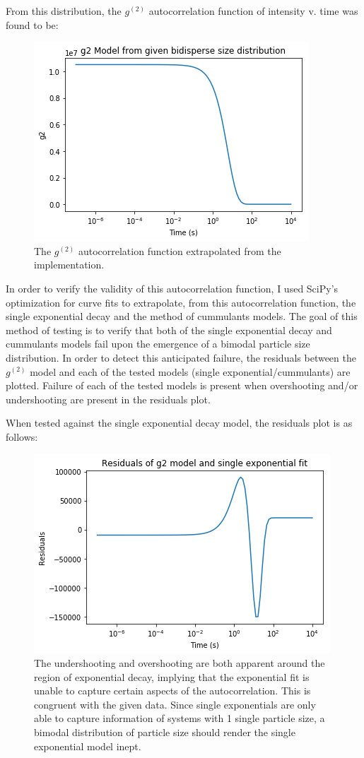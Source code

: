 \documentclass[11pt]{article}
\begin{document}
From this distribution, the $g^{(2)}$ autocorrelation function of intensity v. time was found to be:

\begin{figure}[h]
\centering
\includegraphics[width=0.5\linewidth]{g2.png}
\caption{The $g^{(2)}$ autocorrelation function extrapolated from the implementation.}
\label{fig:g2_model}
\end{figure}

In order to verify the validity of this autocorrelation function, I used SciPy's optimization for curve fits to extrapolate, from this autocorrelation function, the single exponential decay and the method of cummulants models. The goal of this method of testing is to verify that both of the single exponential decay and cummulants models fail upon the emergence of a bimodal particle size distribution. In order to detect this anticipated failure, the residuals between the $g^{(2)}$ model and each of the tested models (single exponential/cummulants) are plotted. Failure of each of the tested models is present when overshooting and/or undershooting are present in the residuals plot. 

When tested against the single exponential decay model, the residuals plot is as follows:

\begin{figure}[h!]
\centering
\includegraphics[width=0.5\linewidth]{expo_residuals.png}
\caption{The undershooting and overshooting are both apparent around the region of exponential decay, implying that the exponential fit is unable to capture certain aspects of the autocorrelation. This is congruent with the given data. Since single exponentials are only able to capture information of systems with 1 single particle size, a bimodal distribution of particle size should render the single exponential model inept.}
\label{fig:expo_residuals}
\end{figure}
\end{document}
